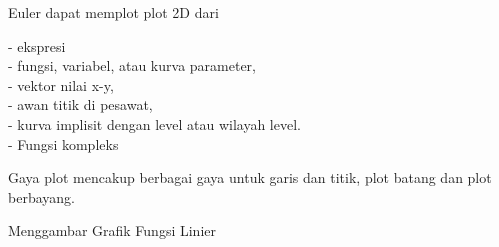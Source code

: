 \documentclass{article}
\begin{document}
\begin{eulernotebook}
\begin{eulercomment}
\begin{eulercomment}
\begin{eulercomment}
\begin{eulercomment}
\begin{eulercomment}
\begin{eulercomment}
\begin{eulercomment}
Euler dapat memplot plot 2D dari

- ekspresi\\
- fungsi, variabel, atau kurva parameter,\\
- vektor nilai x-y,\\
- awan titik di pesawat,\\
- kurva implisit dengan level atau wilayah level.\\
- Fungsi kompleks

Gaya plot mencakup berbagai gaya untuk garis dan titik, plot batang
dan plot berbayang.\\
\begin{eulercomment}
\begin{eulercomment}
Menggambar Grafik Fungsi Linier


\end{eulercomment}
\end{eulercomment}
\end{eulercomment}
\end{eulercomment}
\end{eulercomment}
\end{eulercomment}
\end{eulercomment}
\end{eulercomment}
\end{eulercomment}
\end{eulernotebook}
\end{document}
